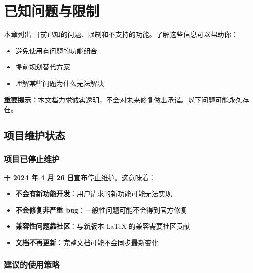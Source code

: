 
\section{已知问题与限制}

本章列出  目前已知的问题、限制和不支持的功能。了解这些信息可以帮助你：

\begin{itemize}
  \item 避免使用有问题的功能组合
  \item 提前规划替代方案
  \item 理解某些问题为什么无法解决
\end{itemize}

\textbf{重要提示：}本文档力求诚实透明，不会对未来修复做出承诺。以下问题可能永久存在。


\subsection{项目维护状态}

\subsubsection{项目已停止维护}

 于 \textbf{2024 年 4 月 26 日}宣布停止维护。这意味着：

\begin{itemize}
  \item \textbf{不会有新功能开发}：用户请求的新功能可能无法实现
  \item \textbf{不会修复非严重 bug}：一般性问题可能不会得到官方修复
  \item \textbf{兼容性问题靠社区}：与新版本 \LaTeX{} 的兼容需要社区贡献
  \item \textbf{文档不再更新}：完整文档可能不会同步最新变化
\end{itemize}

\subsubsection{建议的使用策略}

